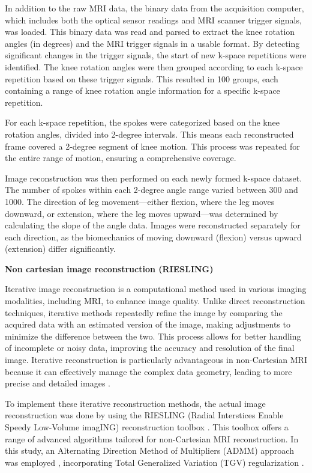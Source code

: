 \documentclass{micro-econ-thesis}
\begin{document}
In addition to the raw MRI data, the binary data from the acquisition computer, which includes both the optical sensor readings and MRI scanner trigger signals, was loaded. This binary data was read and parsed to extract the knee rotation angles (in degrees) and the MRI trigger signals in a usable format. By detecting significant changes in the trigger signals, the start of new k-space repetitions were identified. The knee rotation angles were then grouped according to each k-space repetition based on these trigger signals. This resulted in 100 groups, each containing a range of knee rotation angle information for a specific k-space repetition. 

For each k-space repetition, the spokes were categorized based on the knee rotation angles, divided into 2-degree intervals. This means each reconstructed frame covered a 2-degree segment of knee motion. This process was repeated for the entire range of motion, ensuring a comprehensive coverage.  

Image reconstruction was then performed on each newly formed k-space dataset. The number of spokes within each 2-degree angle range varied between 300 and 1000. The direction of leg movement—either flexion, where the leg moves downward, or extension, where the leg moves upward—was determined by calculating the slope of the angle data. Images were reconstructed separately for each direction, as the biomechanics of moving downward (flexion) versus upward (extension) differ significantly.  

\textbf{Non cartesian image reconstruction (RIESLING)}

Iterative image reconstruction is a computational method used in various imaging modalities, including MRI, to enhance image quality. Unlike direct reconstruction techniques, iterative methods repeatedly refine the image by comparing the acquired data with an estimated version of the image, making adjustments to minimize the difference between the two. This process allows for better handling of incomplete or noisy data, improving the accuracy and resolution of the final image. Iterative reconstruction is particularly advantageous in non-Cartesian MRI because it can effectively manage the complex data geometry, leading to more precise and detailed images \parencite{block_undersampled_2007}.

To implement these iterative reconstruction methods, the actual image reconstruction was done by using the RIESLING (Radial Interstices Enable Speedy Low-Volume imagING)   reconstruction toolbox \parencite{wood2020riesling}. This toolbox offers a range of advanced algorithms tailored for non-Cartesian MRI reconstruction. In this study, an Alternating Direction Method of Multipliers (ADMM) approach was employed \parencite{MAL-016}, incorporating Total Generalized Variation (TGV) regularization \parencite{tgv}. 
\end{document}

